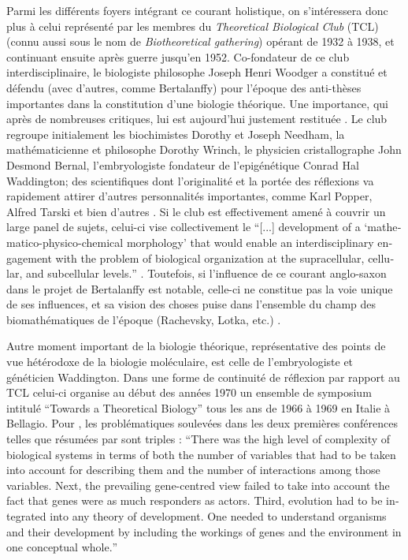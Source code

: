 Parmi les différents foyers intégrant ce courant holistique, on s'intéressera donc plus à celui représenté par les membres du \textit{Theoretical Biological Club} (TCL) (connu aussi sous le nom de \textit{Biotheoretical gathering}) opérant de 1932 à 1938, et continuant ensuite après guerre jusqu'en 1952. Co-fondateur de ce club interdisciplinaire, le biologiste philosophe Joseph Henri Woodger a constitué et défendu (avec d'autres, comme Bertalanffy) pour l'époque des anti-thèses importantes dans la constitution d'une biologie théorique. Une importance, qui après de nombreuses critiques, lui est aujourd'hui justement restituée \autocite{Nicholson2013}. Le club regroupe initialement les biochimistes Dorothy et Joseph Needham, la mathématicienne et philosophe Dorothy Wrinch, le physicien cristallographe John Desmond Bernal, l'embryologiste fondateur de l'epigénétique Conrad Hal Waddington; des scientifiques dont l'originalité et la portée des réflexions va rapidement attirer d'autres personnalités importantes, comme Karl Popper, Alfred Tarski et bien d'autres \autocite[14-43]{Niemann2014}. Si le club est effectivement amené à couvrir un large panel de sujets, celui-ci vise collectivement le \foreignquote{english}{[...] development of a ‘mathematico-physico-chemical morphology’ that would enable an interdisciplinary engagement with the problem of biological organization at the supracellular, cellular, and subcellular levels.} \autocite [277]{Nicholson2013}. Toutefois, si l'influence de ce courant anglo-saxon dans le projet de Bertalanffy est notable, celle-ci ne constitue pas la voie unique de ses influences, et sa vision des choses puise dans l'ensemble du champ des biomathématiques de l'époque (Rachevsky, Lotka, etc.) \autocite[574-585]{Pouvreau2013}.

Autre moment important de la biologie théorique, représentative des points de vue hétérodoxe de la biologie moléculaire, est celle de l'embryologiste et généticien Waddington. Dans une forme de continuité de réflexion par rapport au TCL celui-ci organise au début des années 1970 un ensemble de symposium intitulé \enquote{Towards a Theoretical Biology} tous les ans de 1966 à 1969 en Italie à Bellagio. Pour \textcite[512-513]{Nanjundiah2010}, les problématiques soulevées dans les deux premières conférences telles que résumées par \textcite{Waddington1968} sont triples : \foreignquote{english}{There was the high level of complexity of biological systems in terms of both the number of variables that had to be taken into account for describing them and the number of interactions among those variables. Next, the prevailing gene-centred view failed to take into account the fact that genes were as much responders as actors. Third, evolution had to be integrated into any theory of development. One needed to understand organisms and their development by including the workings of genes and the environment in one conceptual whole.}

